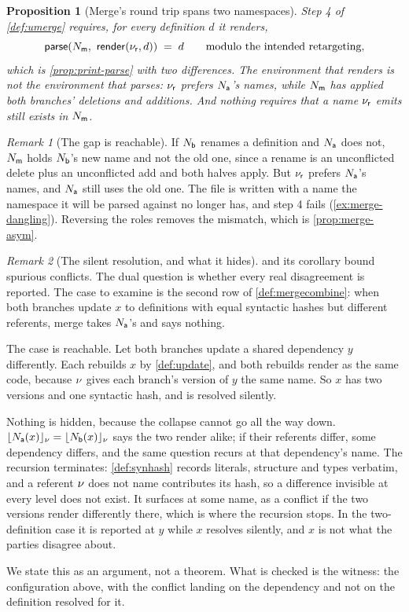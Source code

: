 \documentclass[11pt]{article}
\theoremstyle{definition}
\theoremstyle{plain}
\newtheorem{proposition}{Proposition}[section]
\theoremstyle{remark}
\newtheorem{remark}{Remark}[section]
\begin{document}
\begin{proposition}[Merge's round trip spans two namespaces]\label{prop:merge-print-parse}
Step 4 of \cref{def:umerge} requires, for every definition $d$ it renders,
\[
  \mathsf{parse}(N_{\mathsf{m}},\ \mathsf{render}(\nu_{\mathsf{r}}, d)) \;=\; d \qquad\text{modulo the intended retargeting,}
\]
which is \cref{prop:print-parse} with two differences. The environment that renders is not the
environment that parses: $\nu_{\mathsf{r}}$ prefers $N_{\mathsf{a}}$'s names, while $N_{\mathsf{m}}$ has applied both branches'
deletions and additions. And nothing requires that a name $\nu_{\mathsf{r}}$ emits still exists in $N_{\mathsf{m}}$.
\end{proposition}
\begin{remark}[The gap is reachable]\label{rem:merge-gap}
If $N_{\mathsf{b}}$ renames a definition and $N_{\mathsf{a}}$ does not, $N_{\mathsf{m}}$ holds $N_{\mathsf{b}}$'s new name and not the old one,
since a rename is an unconflicted delete plus an unconflicted add and both halves apply. But $\nu_{\mathsf{r}}$
prefers $N_{\mathsf{a}}$'s names, and $N_{\mathsf{a}}$ still uses the old one. The file is written with a name the
namespace it will be parsed against no longer has, and step 4 fails (\cref{ex:merge-dangling}).
Reversing the roles removes the mismatch, which is \cref{prop:merge-asym}.
\end{remark}

\begin{remark}[The silent resolution, and what it hides]\label{rem:merge-soundness}
 and its corollary bound spurious conflicts. The dual question is whether every
real disagreement is reported. The case to examine is the second row of \cref{def:mergecombine}: when
both branches update $x$ to definitions with equal syntactic hashes but different referents, merge
takes $N_{\mathsf{a}}$'s and says nothing.

The case is reachable. Let both branches update a shared dependency $y$ differently. Each rebuilds
$x$ by \cref{def:update}, and both rebuilds render as the same code, because $\nu$ gives each
branch's version of $y$ the same name. So $x$ has two versions and one syntactic hash, and is resolved
silently.

Nothing is hidden, because the collapse cannot go all the way down.
$\lfloor N_{\mathsf{a}}(x) \rfloor_{\nu} = \lfloor N_{\mathsf{b}}(x) \rfloor_{\nu}$ says the two render alike; if their referents differ,
some dependency differs, and the same question recurs at that dependency's name. The recursion
terminates: \cref{def:synhash} records literals, structure and types verbatim, and a referent $\nu$
does not name contributes its hash, so a difference invisible at every level does not exist. It
surfaces at some name, as a conflict if the two versions render differently there, which is where the
recursion stops. In the two-definition case it is reported at $y$ while $x$ resolves silently, and
$x$ is not what the parties disagree about.

We state this as an argument, not a theorem. What is checked is the witness: the configuration above,
with the conflict landing on the dependency and not on the definition resolved for it.
\end{remark}
\end{document}
